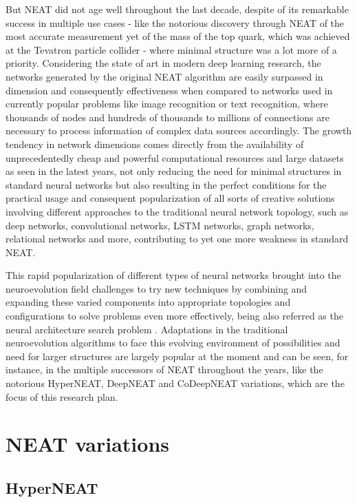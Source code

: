 \documentclass[12pt]{article}
\begin{document}
But NEAT did not age well throughout the last decade, despite of its remarkable success in multiple use cases \cite{Stanley2019} - like the notorious discovery through NEAT of the
most accurate measurement yet of the mass of the top quark, which was achieved at the Tevatron particle collider \cite{PhysRevLett.102.152001} - where minimal structure was a lot more of a priority. Considering the state of art in modern deep learning research, the networks generated by the original NEAT algorithm are easily surpassed in dimension and consequently effectiveness when compared to networks used in currently popular problems like image recognition or text recognition, where thousands of nodes and hundreds of thousands to millions of connections are necessary to process information of complex data sources accordingly. The growth tendency in network dimensions comes directly from the availability of unprecedentedly cheap and powerful computational resources and large datasets as seen in the latest years, not only reducing the need for minimal structures in standard neural networks but also resulting in the perfect conditions for the practical usage and consequent popularization of all sorts of creative solutions involving different approaches to the traditional neural network topology, such as deep networks, convolutional networks, LSTM networks, graph networks, relational networks and more, contributing to yet one more weakness in standard NEAT.

This rapid popularization of different types of neural networks brought into the neuroevolution field challenges to try new techniques by combining and expanding these varied components into appropriate topologies and configurations to solve problems even more effectively, being also referred as the neural architecture search problem \cite{DBLP:journals/corr/ZophL16}. Adaptations in the traditional neuroevolution algorithms to face this evolving environment of possibilities and need for larger structures are largely popular at the moment \cite{Stanley2019} and can be seen, for instance, in the multiple successors of NEAT throughout the years, like the notorious HyperNEAT, DeepNEAT and CoDeepNEAT variations, which are the focus of this research plan.

\section{NEAT variations}
\subsection{HyperNEAT}
\end{document}
